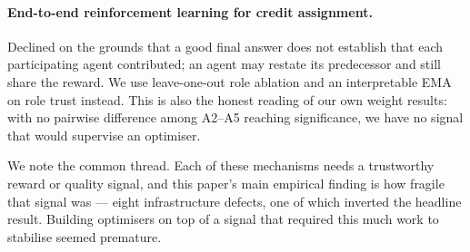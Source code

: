 \documentclass[10pt]{article}
\begin{document}
\paragraph{End-to-end reinforcement learning for credit assignment.}
Declined on the grounds that a good final answer does not establish that each
participating agent contributed; an agent may restate its predecessor and still
share the reward. We use leave-one-out role ablation and an interpretable EMA on
role trust instead. This is also the honest reading of our own weight results:
with no pairwise difference among A2--A5 reaching significance, we have no
signal that would supervise an optimiser.

We note the common thread. Each of these mechanisms needs a trustworthy reward
or quality signal, and this paper's main empirical finding is how fragile that
signal was --- eight infrastructure defects, one of which inverted the headline
result. Building optimisers on top of a signal that required this much work to
stabilise seemed premature.
\end{document}

